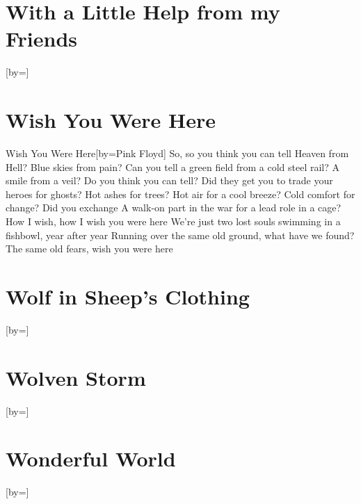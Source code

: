 \documentclass{article}
\begin{document}
\begin{songs}{}
\section{With a Little Help from my Friends}
\begin{song}{}[by={}]
\beginverse

\endverse
\end{song}

\section{Wish You Were Here}
\begin{song}{Wish You Were Here}[by={Pink Floyd}]
\beginverse
So, so you think you can tell
Heaven from Hell? Blue skies from pain?
Can you tell a green field from a cold steel rail?
A smile from a veil? Do you think you can tell?
Did they get you to trade your heroes for ghosts?
Hot ashes for trees? Hot air for a cool breeze?
Cold comfort for change? Did you exchange
A walk-on part in the war for a lead role in a cage?
\endverse
\beginverse
How I wish, how I wish you were here
We're just two lost souls swimming in a fishbowl, year after year
Running over the same old ground, what have we found?
The same old fears, wish you were here
\endverse
\end{song}


\section{Wolf in Sheep's Clothing}
\begin{song}{}[by={}]
\beginverse

\endverse
\end{song}

\section{Wolven Storm}
\begin{song}{}[by={}]
\beginverse

\endverse
\end{song}

\section{Wonderful World}
\begin{song}{}[by={}]
\beginverse

\endverse
\end{song}


\end{songs}
\end{document}
